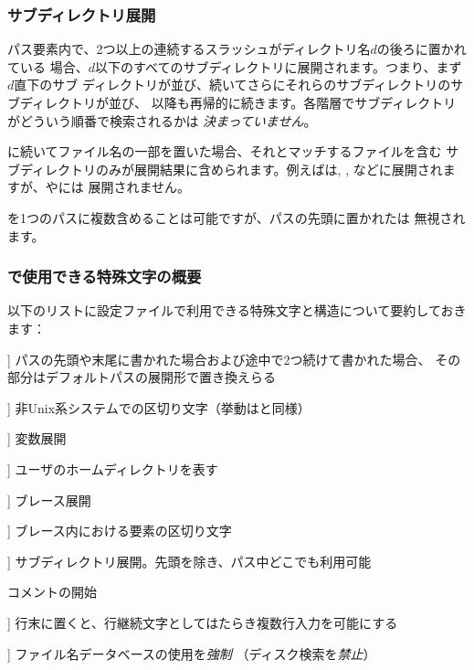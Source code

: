 \documentclass[uplatex,dvipdfmx,12pt,tombow]{jsarticle}
\begin{document}
\subsubsection{サブディレクトリ展開}
\label{sec:subdirectory-expansion}

パス要素内で、2つ以上の連続するスラッシュがディレクトリ名$d$の後ろに置かれている
場合、$d$以下のすべてのサブディレクトリに展開されます。つまり、まず$d$直下のサブ
ディレクトリが並び、続いてさらにそれらのサブディレクトリのサブディレクトリが並び、
以降も再帰的に続きます。各階層でサブディレクトリがどういう順番で検索されるかは
\emph{決まっていません}。

\samp{//}に続いてファイル名の一部を置いた場合、それとマッチするファイルを含む
サブディレクトリのみが展開結果に含められます。例えばは,
, などに展開されますが、やには
展開されません。

\samp{//}を1つのパスに複数含めることは可能ですが、パスの先頭に置かれた\samp{//}は
無視されます。

\subsubsection{で使用できる特殊文字の概要}
\label{sec:cnf-special-chars}

以下のリストに\KPS 設定ファイルで利用できる特殊文字と構造について要約しておきます：
%
\begin{description}
\newcommand{\CODE}[1]{\makebox[3em][l]{\code{#1}}}
\item[\CODE{:}] パスの先頭や末尾に書かれた場合および途中で2つ続けて書かれた場合、
  その部分はデフォルトパスの展開形で置き換えらる
\item[\CODE{;}] 非Unix系システムでの区切り文字（挙動は\code{:}と同様）
\item[\CODE{\$}] 変数展開
\item[\CODE{\string~}] ユーザのホームディレクトリを表す
\item[\CODE{\char`\{...\char`\}}] ブレース展開
\item[\CODE{,}] ブレース内における要素の区切り文字
\item[\CODE{//}] サブディレクトリ展開。先頭を除き、パス中どこでも利用可能
\item[{\makebox[3em][l]{\code{\%}{\normalfont と}\code{\#}}}] コメントの開始
\item[\CODE{\bs}] 行末に置くと、行継続文字としてはたらき複数行入力を可能にする
\item[\CODE{!!}] ファイル名データベースの使用を\emph{強制}
  （ディスク検索を\emph{禁止}）
\end{description}
\end{document}
